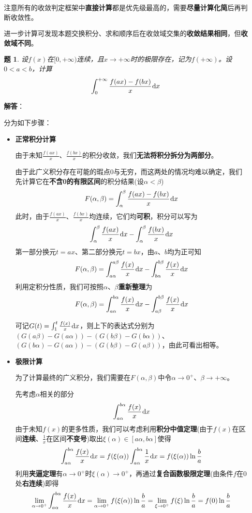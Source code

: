 \documentclass[a4paper,UTF8,fontset=windows,AutoFakeBold]{ctexart}
\newcommand*{\dr}{\hspace{0.07em}\mathrm{d}}
\newcommand*{\note}{\noindent *}
\theoremstyle{ex}
\newtheorem{exercise}{题}
\newcommand{\sol}[1]{{\vspace{5pt}\kaishu\noindent\textbf{解答}：\vspace{-3pt}
\begin{compactitem}
    \item[] #1
\end{compactitem}
}}
\begin{document}
\note 注意所有的收敛判定框架中\textbf{直接计算}都是优先级最高的，需要\textbf{尽量计算化简}后再判断收敛性。

\note 进一步计算可发现本题交换积分、求和顺序后在收敛域交集的\textbf{收敛结果相同}，但\textbf{收敛域不同}。

\begin{framed}
\begin{exercise}
    设$f(x)$在$[0,+\infty)$连续，且$x\to+\infty$时的极限存在，记为$f(+\infty)$。设$0<a<b$，计算
    $$\int_0^{+\infty}\frac{f(ax)-f(bx)}{x}\dr x$$
\end{exercise}
\sol{
    分为如下步骤：
    \begin{itemize}
        \item \textbf{正常积分计算}
        
        \note 由于未知$\frac{f(ax)}{x}$、$\frac{f(bx)}{x}$的积分收敛，我们\textbf{无法将积分拆分为两部分}。

        由于此广义积分存在可能的瑕点0与无穷，而这两处的情况均难以确定，我们先计算它在\textbf{不含0的有限区间}的积分结果(设$\alpha<\beta$)
        $$F(\alpha,\beta)=\int_\alpha^\beta\frac{f(ax)-f(bx)}{x}\dr x$$
        此时，由于$\frac{f(ax)}{x}$、$\frac{f(bx)}{x}$均连续，它们均\textbf{可积}，积分可以写为
        $$\int_\alpha^\beta\frac{f(ax)}{x}\dr x-\int_\alpha^\beta\frac{f(bx)}{x}\dr x$$
        第一部分换元$t=ax$、第二部分换元$t=bx$，由$a$、$b$均为正可知
        $$F(\alpha,\beta)=\int_{a\alpha}^{a\beta}\frac{f(x)}{x}\dr x-\int_{b\alpha}^{b\beta}\frac{f(x)}{x}\dr x$$
        利用定积分性质，我们可按照$\alpha$、$\beta$\textbf{重新整理}为
        $$F(\alpha,\beta)=\int_{a\alpha}^{b\alpha}\frac{f(x)}{x}\dr x-\int_{a\beta}^{b\beta}\frac{f(x)}{x}\dr x$$

        \note 可记$G(t)=\int_1^t\frac{f(x)}{x}\dr x$，则上下的表达式分别为$(G(a\beta)-G(a\alpha))-(G(b\beta)-G(b\alpha))$、$(G(b\alpha)-G(a\alpha))-(G(b\beta)-G(a\beta))$，由此可看出相等。

        \item \textbf{极限计算}
        
        为了计算最终的广义积分，我们需要在$F(\alpha,\beta)$中令$\alpha\to0^+$、$\beta\to+\infty$。

        先考虑$\alpha$相关的部分
        $$\int_{a\alpha}^{b\alpha}\frac{f(x)}{x}\dr x$$
        由于未知$f(x)$的更多性质，我们可以考虑利用\textbf{积分中值定理}(由于$f(x)$在区间\textbf{连续}、$\frac{1}{x}$在区间\textbf{不变号})取出$\xi(\alpha)\in[a\alpha,b\alpha]$使得
        $$\int_{a\alpha}^{b\alpha}\frac{f(x)}{x}\dr x=f(\xi(\alpha))\int_{a\alpha}^{b\alpha}\frac{1}{x}\dr x=f(\xi(\alpha))\ln\frac{b}{a}$$
        利用\textbf{夹逼定理}有$\alpha\to0^+$时$\xi(\alpha)\to0^+$，再通过\textbf{复合函数极限定理}(由条件$f$在0处\textbf{右连续})即得
        $$\lim_{\alpha\to0^+}\int_{a\alpha}^{b\alpha}\frac{f(x)}{x}\dr x=\lim_{\alpha\to0^+}f(\xi(\alpha))\ln\frac{b}{a}=\lim_{\xi\to0^+}f(\xi)\ln\frac{b}{a}=f(0)\ln\frac{b}{a}$$


\end{itemize}}
\end{framed}
\end{document}
